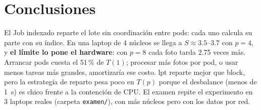 \documentclass[11pt,a4paper]{article}
\begin{document}
\section*{Conclusiones}
El Job indexado reparte el lote sin coordinación entre pods: cada uno calcula su parte con su índice. En una laptop de 4 núcleos se llega a $S \approx 3.5$--$3.7$ con $p=4$, y \textbf{el límite lo pone el hardware}: con $p=8$ cada foto tarda 2.75 veces más. Arrancar pods cuesta el 51\,\% de $T(1)$; procesar más fotos por pod, o usar menos tareas más grandes, amortizaría ese costo. lpt reparte mejor que block, pero la estrategia de reparto pesa poco en $T(p)$ porque el desbalance (menos de 1~s) es chico frente a la contención de CPU. El examen repite el experimento en 3 laptops reales (carpeta \texttt{examen/}), con más núcleos pero con los datos por red.
\end{document}
